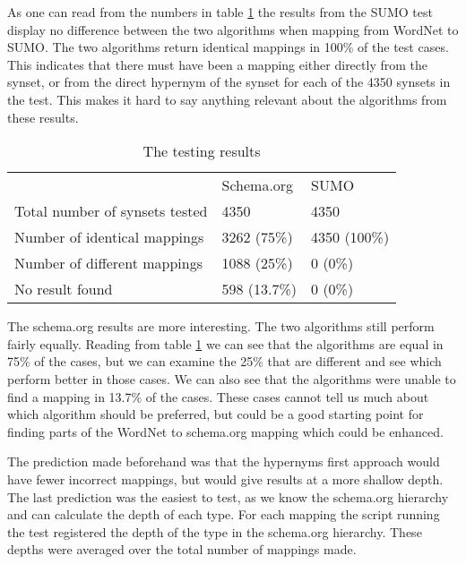As one can read from the numbers in table \ref{table:AlgorithmResults} the results from the SUMO test
display no difference between the two algorithms when mapping from WordNet to SUMO.
The two algorithms return identical mappings in 100\% of the test cases.
This indicates that there must have been a mapping either directly from the synset,
or from the direct hypernym of the synset for each of the 4350 synsets in the test.
This makes it hard to say anything relevant about the algorithms from these results.

\begin{table}[ht] %
	\centering
	\begin{tabular}{lll}
										& Schema.org	& SUMO			\\
		Total number of synsets tested 	& 4350			& 4350			\\
		Number of identical mappings 	& 3262 (75\%)	& 4350 (100\%)	\\
		Number  of different mappings	& 1088 (25\%)	& 0	(0\%)		\\
		No result found					& 598  (13.7\%)	& 0	(0\%)
	\end{tabular}
	\caption{The testing results}
	\label{table:AlgorithmResults}
\end{table}

The schema.org results are more interesting.
The two algorithms still perform fairly equally.
Reading from table \ref{table:AlgorithmResults} we can see that the algorithms are equal in 75\% of the cases,
but we can examine the 25\% that are different and see which perform better in those cases.
We can also see that the algorithms were unable to find a mapping in 13.7\% of the cases.
These cases cannot tell us much about which algorithm should be preferred,
but could be a good starting point for finding parts of the WordNet to schema.org mapping which could be enhanced.

The prediction made beforehand was that the hypernyms first approach would have fewer incorrect mappings,
but would give results at a more shallow depth.
The last prediction was the easiest to test, as we know the schema.org hierarchy and can calculate the depth of each type.
For each mapping the script running the test registered the depth of the type in the schema.org hierarchy.
These depths were averaged over the total number of mappings made.

